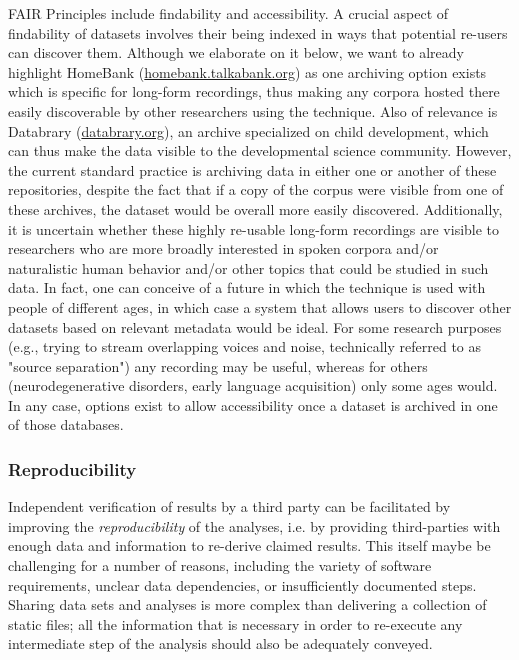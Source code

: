 \documentclass[smallextended]{svjour3}       %
\begin{document}
FAIR Principles include findability and accessibility. A crucial aspect of findability of datasets involves their being indexed in ways that potential re-users can discover them. Although we elaborate on it below, we want to already highlight HomeBank (\url{homebank.talkabank.org}) as one archiving option exists which is specific for long-form recordings, thus making any corpora hosted  there easily discoverable by other researchers using the technique. Also of relevance is Databrary (\url{databrary.org}), an archive specialized on child development, which can thus make the data visible to the developmental science community. However, the current standard practice  is archiving data in either one or another of these repositories, despite the fact that if a copy of the corpus were visible from one of these archives, the dataset would be overall more easily discovered. Additionally, it is uncertain whether these highly re-usable long-form recordings are visible to researchers who are more broadly interested in spoken corpora and/or naturalistic human behavior and/or other topics that could be studied in such data. In fact, one can conceive of a future in which the technique is used with people of different ages, in which case a system that allows users to discover other datasets based on relevant metadata would be ideal. For some research purposes (e.g., trying to stream overlapping voices and noise, technically referred to as "source separation") any recording may be useful, whereas for others (neurodegenerative disorders, early language acquisition) only some ages would. In any case, options exist to allow accessibility once a dataset is archived in one of those databases.

\subsubsection*{Reproducibility}

Independent verification of results by a third party can be facilitated by improving the \emph{reproducibility} of the analyses, i.e. by providing third-parties with enough data and information to re-derive claimed results. This itself maybe be challenging for a number of reasons, including the variety of software requirements, unclear data dependencies, or insufficiently documented steps. Sharing data sets and analyses is more complex than delivering a collection of static files; all the information that is necessary in order to re-execute any intermediate step of the analysis should also be adequately conveyed.
 
\end{document}
